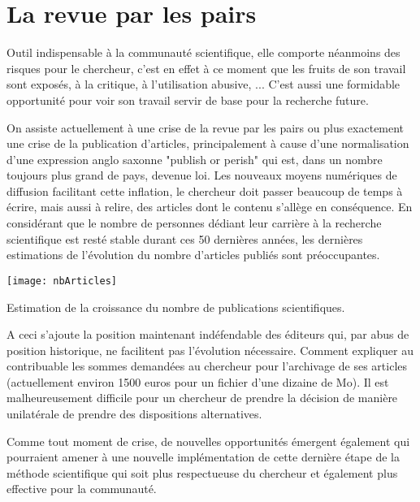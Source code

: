 \section{\nmu La revue par les pairs} \label{sec:pairs}

Outil indispensable à la communauté scientifique, elle comporte néanmoins des risques pour le chercheur, c'est en effet à ce moment que les fruits de son travail sont exposés, à la critique, à l'utilisation abusive, ... C'est aussi une formidable opportunité pour voir son travail servir de base pour la recherche future.

On assiste actuellement à une \og crise \fg de la revue par les pairs ou plus exactement une crise de la publication d'articles, principalement à cause d'une normalisation d'une expression anglo saxonne "publish or perish" qui est, dans un nombre toujours plus grand de pays, devenue loi. Les nouveaux moyens numériques de diffusion facilitant cette inflation, le chercheur doit passer beaucoup de temps à écrire, mais aussi à relire, des articles dont le contenu s'allège en conséquence. En considérant que le nombre de personnes dédiant leur carrière à la recherche scientifique est resté stable durant ces 50 dernières années, les dernières estimations de l'évolution du nombre d'articles publiés sont préoccupantes\cite{bornmann2015growth}.

\begin{marginfigure}
  \texttt{[image: nbArticles]}
  \caption{Estimation de la croissance du nombre de publications scientifiques.}
\end{marginfigure}

A ceci s'ajoute la position maintenant indéfendable des éditeurs qui, par abus de position historique, ne facilitent pas l'évolution nécessaire. Comment expliquer au contribuable les sommes demandées au chercheur pour l'archivage de ses articles (actuellement environ 1500 euros pour un fichier d'une dizaine de Mo). Il est malheureusement difficile pour un chercheur de prendre la décision de manière unilatérale de prendre des dispositions alternatives.

Comme tout moment de crise, de nouvelles opportunités émergent également qui pourraient amener à une nouvelle implémentation de cette dernière étape de la méthode scientifique qui soit plus respectueuse du chercheur et également plus effective pour la communauté. 

